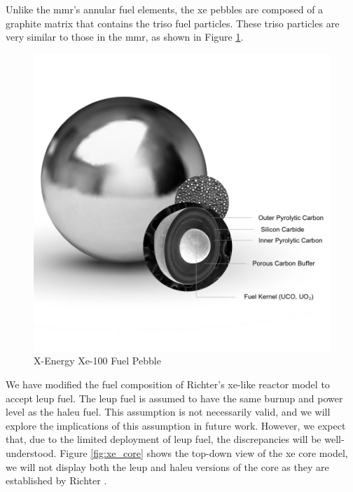 Unlike the \gls{mmr}'s annular fuel elements, the \gls{xe} pebbles are composed of a graphite matrix that contains the \gls{triso} fuel particles. These \gls{triso} particles are very similar to those in the \gls{mmr}, as shown in Figure \ref{fig:xe_fuel}.

\begin{figure}[H]
    \centering
    \includegraphics[scale=0.28]{images/reactor_design/graphic-triso-x-pebble.jpg}
    \caption{X-Energy Xe-100 Fuel Pebble \cite{xe_fuel}}
    \label{fig:xe_fuel}
\end{figure}


We have modified the fuel composition of Richter's \gls{xe}-like reactor model to accept \gls{leup} fuel. The \gls{leup} fuel is assumed to have the same burnup and power level as the \gls{haleu} fuel. This assumption is not necessarily valid, and we will explore the implications of this assumption in future work. However, we expect that, due to the limited deployment of \gls{leup} fuel, the discrepancies will be well-understood. Figure \ref{fig:xe_core} shows the top-down view of the \gls{xe} core model, we will not display both the \gls{leup} and \gls{haleu} versions of the core as they are established by Richter \cite{richter_thesis_2022}.

